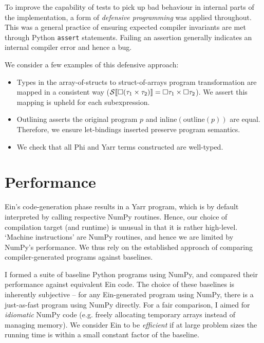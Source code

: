 To improve the capability of tests to pick up bad behaviour in internal parts of the implementation, a form of \textit{defensive programming} was applied throughout.
This was a general practice of ensuring expected compiler invariants are met through Python \texttt{assert} statements. Failing an assertion generally indicates an internal compiler error and hence a bug. 

\needspace{2em}
We consider a few examples of this defensive approach: \begin{itemize}
    \item Types in the array-of-structs to struct-of-arrays program transformation are mapped in a consistent way ($\phisoa{\phivectype{(\phipairtype{\tau_1}{\tau_2}})} = \phipairtype{\phivectype{\tau_1}}{\phivectype{\tau_2}}$). We assert this mapping is upheld for each subexpression.
    \item Outlining asserts the original program $p$ and $\mathrm{inline}(\mathrm{outline}(p))$ are equal. Therefore, we ensure let-bindings inserted preserve program semantics.
    \item We check that all Phi and Yarr terms constructed are well-typed.
\end{itemize}

\section{Performance}
\label{benchmarks}

Ein's code-generation phase results in a Yarr program, which is by default interpreted by calling respective NumPy routines. 
Hence, our choice of compilation target (and runtime) is unusual in that it is rather high-level.
`Machine instructions' are NumPy routines, and hence we are limited by NumPy's performance. 
We thus rely on the established approach of comparing compiler-generated programs against baselines.

I formed a suite of baseline Python programs using NumPy, and compared their performance against equivalent Ein code.
The choice of these baselines is inherently subjective -- for any Ein-generated program using NumPy, there is a just-as-fast program using NumPy directly.
For a fair comparison, I aimed for \textit{idiomatic} NumPy code (e.g. freely allocating temporary arrays instead of managing memory).
We consider Ein to be \textit{efficient} if at large problem sizes the running time is within a small constant factor of the baseline. 


